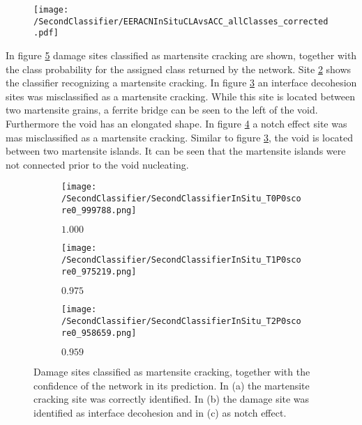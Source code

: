 \begin{figure}
\centering
\texttt{[image: /SecondClassifier/EERACNInSituCLAvsACC\_allClasses\_corrected.pdf]}
\caption{}
\label{fig:SecondClassifierOverallAllClasses}
\end{figure}

In figure \ref{fig:InSituMartensiteSamples} damage sites classified as martensite cracking are shown, together with the class probability for the assigned class returned by the network. Site \ref{sub:InSituMartensiteSamplesM} shows the classifier recognizing a martensite cracking. In figure \ref{sub:InSituMartensiteSamplesI} an interface decohesion sites was misclassified as a martensite cracking. While this site is located between two martensite grains, a ferrite bridge can be seen to the left of the void. Furthermore the void has an elongated shape. In figure \ref{sub:InSituMartensiteSamplesN} a notch effect site was mas misclassified as a martensite cracking. Similar to figure \ref{sub:InSituMartensiteSamplesI}, the void is located between two martensite islands. It can be seen that the martensite islands were not connected prior to the void nucleating.


\begin{figure}[H]
\centering
\begin{subfigure}{0.3\textwidth}
\texttt{[image: /SecondClassifier/SecondClassifierInSitu\_T0P0score0\_999788.png]}
\caption{$1.000$}
\label{sub:InSituMartensiteSamplesM}
\end{subfigure}
\begin{subfigure}{0.3\textwidth}
\texttt{[image: /SecondClassifier/SecondClassifierInSitu\_T1P0score0\_975219.png]}
\caption{$0.975$}
\label{sub:InSituMartensiteSamplesI}
\end{subfigure}
\begin{subfigure}{0.3\textwidth}
\texttt{[image: /SecondClassifier/SecondClassifierInSitu\_T2P0score0\_958659.png]}
\caption{$0.959$}
\label{sub:InSituMartensiteSamplesN}
\end{subfigure}
\caption{Damage sites classified as martensite cracking, together with the confidence of the network in its prediction. In (a) the martensite cracking site was correctly identified. In (b) the damage site was identified as interface decohesion and in (c) as notch effect. }
\label{fig:InSituMartensiteSamples}
\end{figure}

